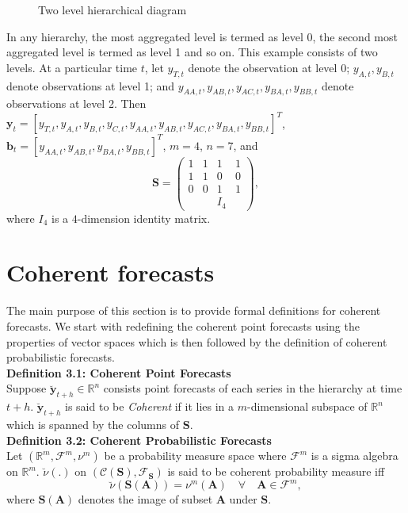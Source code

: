 \documentclass[a4paper, 11pt]{article}
\begin{document}
\begin{figure}
	\begin{center}
		  
		 
		\qobitree
	\end{center}
	\caption{Two level hierarchical diagram}
\end{figure}
\noindent
In any hierarchy, the most aggregated level is termed as level 0, the second most aggregated level is termed as level 1 and so on. This example consists of two levels. At a particular time $t$, let $y_{T,t}$ denote the observation at level 0; $y_{A,t}, y_{B,t} $ denote observations at level 1; and $y_{AA,t}, y_{AB,t}, y_{AC,t}, y_{BA,t}, y_{BB,t}$ denote observations at level 2. Then $\mathbold{y}_t = [y_{T,t},y_{A,t}, y_{B,t},y_{C,t},y_{AA,t}, y_{AB,t}, y_{AC,t}, y_{BA,t}, y_{BB,t}]^T$, \\$\mathbold{b}_t = [y_{AA,t}, y_{AB,t}, y_{BA,t}, y_{BB,t}]^T$, $m=4$, $n=7$, and $$ \mathbold{S} = \begin{pmatrix} 1& 1 &1 &1  \\ 1 &1 & 0 &0 \\   0&0  & 1 & 1 \\ & & I_4 &   \end{pmatrix}, $$ where $I_4$ is a $4$-dimension identity matrix. \\  


\section{Coherent forecasts}

The main purpose of this section is to provide formal definitions for coherent forecasts. We start with redefining the coherent point forecasts using the properties of vector spaces which is then followed by the definition of coherent probabilistic forecasts. 
\\

\noindent
\textbf{Definition 3.1: Coherent Point Forecasts}\\
\noindent
Suppose $\bm{\breve{y}}_{t+h} \in \mathbb{R}^n$ consists point forecasts of each series in the hierarchy at time $t+h$.  $\bm{\breve{y}}_{t+h}$ is said to be \textit{Coherent} if it lies in a $m$-dimensional subspace of $\bm{\mathbb{R}}^n$ which is spanned by the columns of $\bm{S}$. \\

\noindent
\textbf{Definition 3.2: Coherent Probabilistic Forecasts}\\
\noindent
Let $(\bm{\mathbb{R}}^m, \bm{\mathscr{F}}^m, \nu^m)$ be a probability measure space where $\mathscr{F}^m$ is a sigma algebra on $\bm{\mathbb{R}}^m$. $\breve{\nu}(.)$ on $(\mathscr{C}(\bm{S}), \mathscr{F}_{\bm{S}})$ is said to be coherent probability measure iff $$\breve{\nu}(\bm{S}(\bm{A})) = \nu^m(\bm{A}) \quad \forall \quad \bm{A} \in \mathscr{F}^m,$$ where $\bm{S}(\bm{A})$ denotes the image of subset $\bm{A}$ under $\bm{S}$. 
\end{document}
